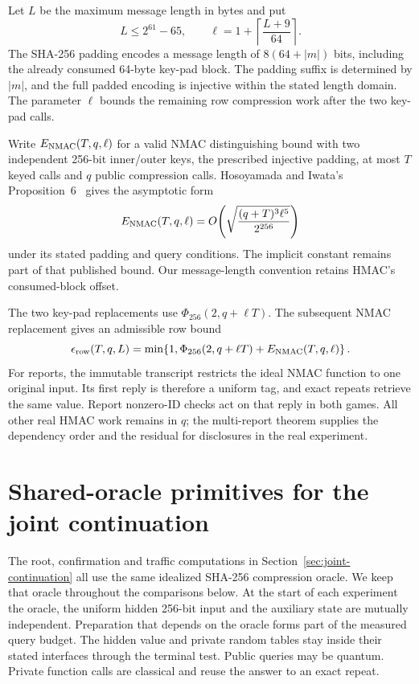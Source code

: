\documentclass[pdflatex]{sn-jnl}
\theoremstyle{thmstyleone}
\theoremstyle{thmstylethree}
\theoremstyle{thmstyletwo}
\begin{document}
Let $L$ be the maximum message length in bytes and put
\[
 L\le2^{61}-65,\qquad
 \ell=1+\left\lceil\frac{L+9}{64}\right\rceil.
\]
The SHA-256 padding encodes a message length of $8(64+|m|)$ bits, including
the already consumed 64-byte key-pad block. The padding suffix is determined by $|m|$, and the
full padded encoding is injective within the stated length domain.
The parameter $\ell$ bounds the remaining
row compression work after the two key-pad calls.

Write $E_{\rm NMAC}(T,q,\ell)$ for a valid NMAC distinguishing bound with two
independent 256-bit inner/outer keys, the prescribed injective padding, at
most $T$ keyed calls and $q$ public compression calls. Hosoyamada and Iwata's
Proposition~6~\cite{hmacqrom2021} gives the asymptotic form
\[
 E_{\rm NMAC}(T,q,\ell)
 =O\!\left(\sqrt{\frac{(q+T)^3\ell^5}{2^{256}}}\right)
\]
under its stated padding and query conditions. The implicit constant remains
part of that published bound. Our message-length convention retains HMAC's
consumed-block offset.

The two key-pad replacements use $\Phi_{256}(2,q+\ell T)$. The subsequent
NMAC replacement gives an admissible row bound
\[
 \epsilon_{\rm row}(T,q,L)
 =\min\!\left\{1,
 \Phi_{256}(2,q+\ell T)+E_{\rm NMAC}(T,q,\ell)\right\}.
\]
For reports, the immutable transcript restricts the ideal NMAC function
to one original input. Its first reply is therefore a uniform tag, and
exact repeats retrieve the same value.
Report nonzero-ID checks act on that reply in both games. All other real
HMAC work remains in $q$; the multi-report theorem supplies the dependency
order and the residual for disclosures in the real experiment.
\section{Shared-oracle primitives for the joint continuation}
\label{app:joint-primitives}

The root, confirmation and traffic computations in
Section~\ref{sec:joint-continuation} all use the same idealized SHA-256
compression oracle. We keep that oracle throughout the comparisons
below. At the start of each experiment the oracle, the uniform hidden
256-bit input and the auxiliary state are mutually independent.
Preparation that depends on the oracle forms part of the measured
query budget. The hidden value and private random tables stay inside
their stated interfaces through the terminal test. Public queries may
be quantum. Private function calls are classical and reuse the answer
to an exact repeat.
\end{document}

